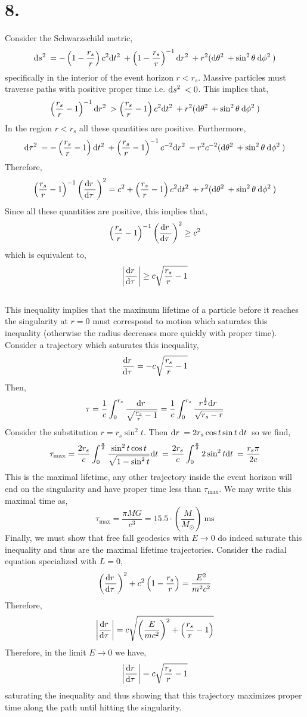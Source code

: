\documentclass[12pt]{article}
\begin{document}
\section*{8.}

Consider the Schwarzschild metric,
\[ \mathrm{d}s^2 \: = - \left( 1 - \frac{r_s}{r} \right) c^2 \mathrm{d}t^2 \: + \left( 1 - \frac{r_s}{r} \right)^{-1} \mathrm{d}r^2 \: + r^2 ( \mathrm{d}\theta^2 \: + \sin^2{\theta} \: \mathrm{d}\phi^2 \: )  \]
specifically in the interior of the event horizon $r < r_s$. Massive particles must traverse paths with positive proper time i.e. $\mathrm{d}s^2 \: < 0$. This implies that,
\[  \left( \frac{r_s}{r} - 1 \right)^{-1} \mathrm{d}r^2 \:  >  \left( \frac{r_s}{r} - 1 \right) c^2 \mathrm{d}t^2 \: +  r^2 ( \mathrm{d}\theta^2 \: + \sin^2{\theta} \: \mathrm{d}\phi^2 \: ) \]
In the region $r < r_s$ all these quantities are positive. Furthermore,
\[ \mathrm{d}\tau^2 \: = -\left( \frac{r_s}{r} - 1 \right) \mathrm{d}t^2 \: + \left( \frac{r_s}{r} - 1 \right)^{-1} c^{-2} \mathrm{d}r^2 \: - r^2 c^{-2} ( \mathrm{d}\theta^2 \: + \sin^2{\theta} \: \mathrm{d}\phi^2 \: ) \]
Therefore,
\[ \left( \frac{r_s}{r} - 1 \right)^{-1} \left( \frac{\mathrm{d}r \:}{\mathrm{d}\tau \:} \right)^2 = c^2 + \left( \frac{r_s}{r} - 1 \right) c^2 \mathrm{d}t^2 \: + r^2 ( \mathrm{d}\theta^2 \: + \sin^2{\theta} \: \mathrm{d}\phi^2 \: ) \]
Since all these quantities are positive, this implies that,
\[ \left( \frac{r_s}{r} - 1 \right)^{-1} \left( \frac{\mathrm{d}r \:}{\mathrm{d}\tau \:} \right)^2 \ge c^2 \]
which is equivalent to,
\[ \left| \frac{\mathrm{d}r \:}{\mathrm{d}\tau \:} \right| \ge c \sqrt{\frac{r_s}{r} - 1} \]
\bigskip\\
This inequality implies that the maximum lifetime of a particle before it reaches the singularity at $r = 0$ must correspond to motion which saturates this inequality (otherwise the radius decreases more quickly with proper time). Consider a trajectory which saturates this inequality,
\[ \frac{\mathrm{d}r \:}{\mathrm{d}\tau \:} = - c \sqrt{\frac{r_s}{r} - 1} \]
Then,
\[ \tau = \frac{1}{c} \int_{0}^{r_s} \frac{\mathrm{d}r \:}{\sqrt{\frac{r_s}{r} - 1}} =  \frac{1}{c} \int_0^{r_s} \frac{r^{\frac{1}{2}} \mathrm{d}r \:}{\sqrt{r_s - r}} \]
Consider the substitution $r = r_s \sin^2{t}$. Then $\mathrm{d}r \: = 2 r_s \cos{t} \sin{t} \: \mathrm{d}t \:$ so we find,
\[ \tau_{\text{max}} = \frac{2r_s}{c} \int_0^{\frac{\pi}{2}} \frac{\sin^2{t} \cos{t}}{\sqrt{1 - \sin^2{t}}} \mathrm{d}t \: = \frac{2 r_s}{c} \int_0^{\frac{\pi}{2}} 2 \sin^2{t} \mathrm{d}t \: = \frac{r_s \pi}{2c} \]
This is the maximal lifetime, any other trajectory inside the event horizon will end on the singularity and have proper time less than $\tau_{\text{max}}$. We may write this maximal time as,
\[ \tau_{\text{max}} = \frac{\pi MG}{c^3} = 15.5 \cdot \left( \frac{M}{M_{\odot}} \right) \:\text{ms} \]
Finally, we must show that free fall geodesics with $E \to 0$ do indeed saturate this inequality and thus are the maximal lifetime trajectories. Consider the radial equation specialized with $L = 0$,
\[ \left( \frac{\mathrm{d}r \:}{\mathrm{d}\tau \:} \right)^2 + c^2 \left( 1 - \frac{r_s}{r} \right) = \frac{E^2}{m^2 c^2} \]
Therefore,
\[ \left| \frac{\mathrm{d}r \:}{\mathrm{d}\tau \:} \right| = c \sqrt{\left( \frac{E}{mc^2} \right)^2 + \left( \frac{r_s}{r} - 1 \right)} \]
Therefore, in the limit $E \to 0$ we have,
\[ \left| \frac{\mathrm{d}r \:}{\mathrm{d}\tau \:} \right| = c \sqrt{\frac{r_s}{r} - 1} \]
saturating the inequality and thus showing that this trajectory maximizes proper time along the path until hitting the singularity.
\end{document}

